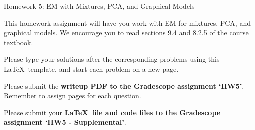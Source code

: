 \documentclass[submit]{harvardml}
\begin{document}
\begin{center}
{\Large Homework 5: EM with Mixtures, PCA, and Graphical Models}\\
\end{center}

This homework assignment will have you work with EM for mixtures, PCA,
and graphical models. We encourage you to read sections 9.4 and 8.2.5 of the course textbook.

Please type your solutions after the corresponding problems using this
\LaTeX\ template, and start each problem on a new page.

Please submit the \textbf{writeup PDF to the Gradescope assignment `HW5'}. Remember to assign pages for each question.

Please submit your \textbf{\LaTeX\ file and code files to the Gradescope assignment `HW5 - Supplemental'}. 
\end{document}

